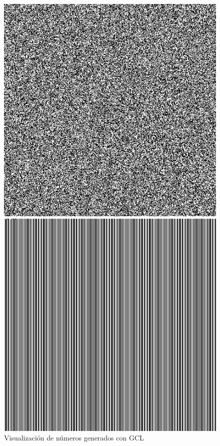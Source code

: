 \documentclass{article}
\begin{document}
\begin{figure}[H]
    \centering
    \begin{minipage}[t]{0.31\textwidth}
        \centering
        \includegraphics[width=\textwidth]{visualizaciones_prueba/GCL_bitmap.png}
        \caption{Visualización de números generados con GCL}
        \label{fig:gcl_vis}
    \end{minipage}
    \hfill
    \begin{minipage}[t]{0.31\textwidth}
        \centering
        \includegraphics[width=\textwidth]{visualizaciones_prueba/cuadrados_Medios_bitmap.png}

\end{minipage}
\end{figure}
\end{document}
